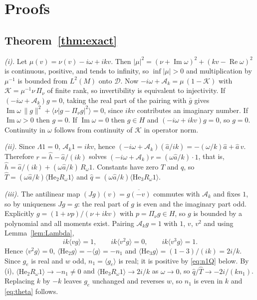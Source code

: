 \documentclass[11pt]{article}
\newcommand{\He}{\mathrm{He}}
\newcommand{\cA}{\mathcal{A}}
\newcommand{\avg}[1]{\langle #1\rangle}
\renewcommand{\Re}{\operatorname{Re}}
\renewcommand{\Im}{\operatorname{Im}}
\theoremstyle{remark}
\begin{document}
\section{Proofs}

\subsection{Theorem~\ref{thm:exact}}

\emph{(i).} Let $\mu(v) = \nu(v)-i\omega+ikv$. Then
$|\mu|^2 = (\nu+\Im\omega)^2 + (kv-\Re\omega)^2$ is continuous, positive, and
tends to infinity, so $\inf|\mu|>0$ and multiplication by $\mu^{-1}$ is
bounded from $L^2(M)$ onto $\mathcal{D}$. Now
$-i\omega+\cA_k = \mu\,(1-\mathcal{K})$ with
$\mathcal{K} = \mu^{-1}\nu\,\Pi_\nu$ of finite rank, so invertibility is
equivalent to injectivity. If $(-i\omega+\cA_k)g=0$, taking the real part of
the pairing with $\bar g$ gives
$\Im\omega\,\|g\|^2 + \avg{\nu|g-\Pi_\nu g|^2} = 0$, since $ikv$ contributes
an imaginary number. If $\Im\omega>0$ then $g=0$. If $\Im\omega=0$ then
$g\in H$ and $(-i\omega+ikv)g=0$, so $g=0$. Continuity in $\omega$ follows
from continuity of $\mathcal{K}$ in operator norm.

\emph{(ii).} Since $\Lambda1=0$, $\cA_k1 = ikv$, hence
$(-i\omega+\cA_k)(\hat a/ik) = -(\omega/k)\hat a + \hat a\,v$. Therefore
$r = \hat h-\hat a/(ik)$ solves $(-i\omega+\cA_k)r = (\omega\hat a/k)\cdot1$,
that is, $\hat h = \hat a/(ik) + (\omega\hat a/k)\,R_\omega1$. Constants have
zero $T$ and $q$, so $\hat T = (\omega\hat a/k)\avg{\He_2R_\omega1}$ and
$\hat q = (\omega\hat a/k)\avg{\He_3R_\omega1}$.

\emph{(iii).} The antilinear map $(Jg)(v) = \overline{g(-v)}$ commutes with
$\cA_k$ and fixes $1$, so by uniqueness $Jg=g$: the real part of $g$ is even
and the imaginary part odd. Explicitly $g = (1+\nu p)/(\nu+ikv)$ with
$p=\Pi_\nu g\in H$, so $g$ is bounded by a polynomial and all moments exist.
Pairing $\cA_kg=1$ with $1$, $v$, $v^2$ and using Lemma~\ref{lem:Lambda},
\begin{equation}
  ik\avg{vg} = 1,\qquad ik\avg{v^2g} = 0,\qquad ik\avg{v^3g} = 1 .
  \label{eq:mom}
\end{equation}
Hence $\avg{v^2g}=0$, $\avg{\He_2g} = -\avg{g} = -n_1$ and
$\avg{\He_3g} = (1-3)/(ik) = 2i/k$. Since $g_e$ is real and $w$ odd,
$n_1 = \avg{g_e}$ is real; it is positive by \eqref{eq:n1Q} below. By (i),
$\avg{\He_2R_\omega1}\to-n_1\ne0$ and $\avg{\He_3R_\omega1}\to2i/k$ as
$\omega\to0$, so $\hat q/\hat T\to-2i/(kn_1)$. Replacing $k$ by $-k$ leaves
$g_e$ unchanged and reverses $w$, so $n_1$ is even in $k$ and
\eqref{eq:theta} follows.
\end{document}
